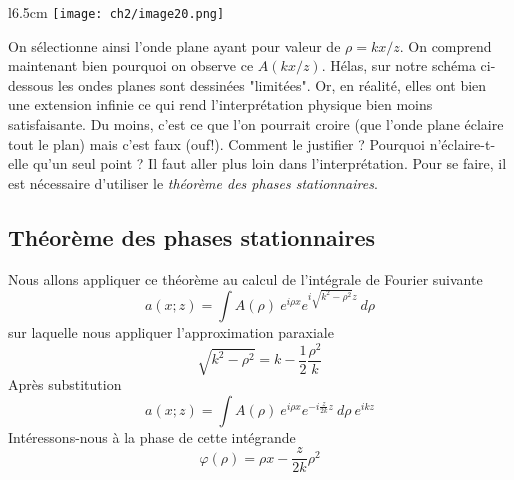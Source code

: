 \begin{wrapfigure}[10]{l}{6.5cm}
\vspace{-3mm}
\texttt{[image: ch2/image20.png]}
\end{wrapfigure}
On sélectionne ainsi l'onde plane ayant pour valeur de $\rho = kx/z$. On comprend maintenant 
bien pourquoi on observe ce $A(kx/z)$. Hélas, sur notre schéma ci-dessous les ondes planes 
sont dessinées "limitées". Or, en réalité, elles ont bien une extension infinie ce qui rend 
l'interprétation physique bien moins satisfaisante. Du moins, c'est ce que l'on pourrait 
croire (que l'onde plane éclaire tout le plan) mais c'est faux (ouf!). Comment le justifier 
? Pourquoi n'éclaire-t-elle qu'un seul point ? Il faut aller plus loin dans l'interprétation. 
Pour se faire, il est nécessaire d'utiliser le \textit{théorème des phases stationnaires}.

	\subsection{Théorème des phases stationnaires}
	Nous allons appliquer ce théorème au calcul de l'intégrale de Fourier suivante
	\begin{equation}
	a(x;z) = \int A(\rho)\ e^{i\rho x}e^{i\sqrt{k^2-\rho^2}z}\ d\rho
	\end{equation}
	sur laquelle nous appliquer l'approximation paraxiale
	\begin{equation}
	\sqrt{k^2-\rho^2} = k-\frac{1}{2}\frac{\rho^2}{k}
	\end{equation}
	Après substitution
	\begin{equation}
	a(x;z) = \int A(\rho)\ e^{i\rho x}e^{-i\frac{z}{2k} z}\ d\rho\ e^{ikz}
	\end{equation}
	Intéressons-nous à la phase de cette intégrande 
	\begin{equation}
	\varphi(\rho) = \rho x - \dfrac{z}{2k}\rho^2
	\end{equation}
	
